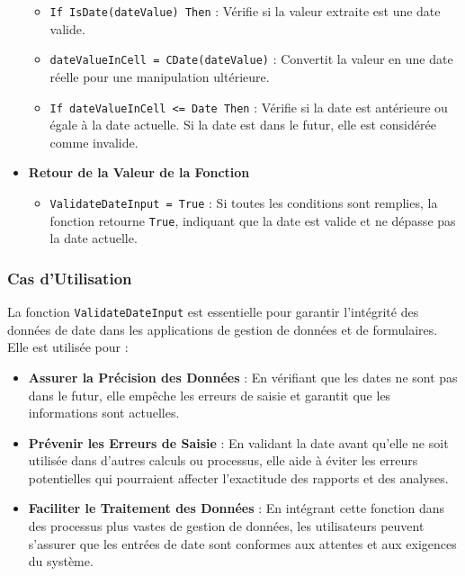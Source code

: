 \documentclass[a4paper, oneside, 12pt, final]{extreport}
\begin{document}
\begin{itemize}
\begin{itemize}
    \item \texttt{If IsDate(dateValue) Then} : Vérifie si la valeur extraite est une date valide.
    \item \texttt{dateValueInCell = CDate(dateValue)} : Convertit la valeur en une date réelle pour une manipulation ultérieure.
    \item \texttt{If dateValueInCell <= Date Then} : Vérifie si la date est antérieure ou égale à la date actuelle. Si la date est dans le futur, elle est considérée comme invalide.
\end{itemize}

\item\textbf{Retour de la Valeur de la Fonction}

\begin{itemize}
    \item \texttt{ValidateDateInput = True} : Si toutes les conditions sont remplies, la fonction retourne \texttt{True}, indiquant que la date est valide et ne dépasse pas la date actuelle.
\end{itemize}
\end{itemize}
\subsubsection{Cas d'Utilisation}

La fonction \texttt{ValidateDateInput} est essentielle pour garantir l'intégrité des données de date dans les applications de gestion de données et de formulaires. Elle est utilisée pour :

\begin{itemize}
    \item \textbf{Assurer la Précision des Données} : En vérifiant que les dates ne sont pas dans le futur, elle empêche les erreurs de saisie et garantit que les informations sont actuelles.
    \item \textbf{Prévenir les Erreurs de Saisie} : En validant la date avant qu'elle ne soit utilisée dans d'autres calculs ou processus, elle aide à éviter les erreurs potentielles qui pourraient affecter l'exactitude des rapports et des analyses.
    \item \textbf{Faciliter le Traitement des Données} : En intégrant cette fonction dans des processus plus vastes de gestion de données, les utilisateurs peuvent s'assurer que les entrées de date sont conformes aux attentes et aux exigences du système.
\end{itemize}
\end{document}
